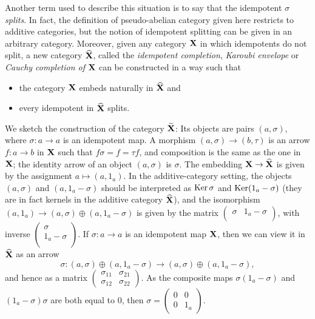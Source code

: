 Another term used to describe this situation is to say that the
idempotent $\sigma$ \emph{splits}. In fact, the definition of
pseudo-abelian category given here restricts to additive categories,
but the notion of idempotent splitting can be given in an arbitrary
category. Moreover, given any category ${\bf X}$ in which idempotents
do not split, a new category $\widehat{\bf X}$, called the
\emph{idempotent completion}, \emph{Karoubi envelope} or \emph{Cauchy
  completion of} ${\bf X}$ can be constructed in a way such that
\begin{itemize}
\item the category ${\bf X}$ embeds naturally in $\widehat{\bf X}$ and
\item every idempotent in $\widehat{\bf X}$ splits.
\end{itemize}
We sketch the construction of the category $\widetilde{{\bf X}}$: Its
objects are pairs $(a,\sigma )$, where $\sigma :a\to a$ is an
idempotent map. A morphism $(a,\sigma )\to (b,\tau )$ is an arrow
$f:a\to b$ in ${\bf X}$ such that $f\sigma =f=\tau f$, and composition
is the same as the one in ${\bf X}$; the identity arrow of an object
$(a,\sigma )$ is $\sigma$. The embedding ${\bf X}\to \widehat{\bf X}$
is given by the assignment $a\mapsto (a,1_a)$. In the
additive-category setting, the objects $(a,\sigma )$ and
$(a,1_a-\sigma )$ should be interpreted as $\operatorname{Ker}\sigma $ and
$\operatorname{Ker}(1_a-\sigma )$ (they are in fact kernels in the additive
category $\widehat{{\bf X}}$), and the isomorphism $(a,1_a)\to
(a,\sigma )\oplus (a,1_a-\sigma )$ is given by the matrix $\left
  (\begin{smallmatrix} \sigma & 1_a-\sigma \\ \end{smallmatrix} \right
)$, with inverse $\left (\begin{smallmatrix} \sigma \\ 1_a-\sigma
    \\ \end{smallmatrix} \right )$. If $\sigma :a\to a$ is an
idempotent map ${\bf X}$, then we can view it in $\widehat{\bf X}$ as
an arrow
$$\sigma :(a,\sigma )\oplus (a,1_a-\sigma )\longrightarrow (a,\sigma )\oplus (a,1_a-\sigma ),$$
and hence as a matrix $\left (\begin{smallmatrix} \sigma_{11} &
    \sigma_{21} \\ \sigma_{12} & \sigma_{22} \end{smallmatrix} \right
)$. As the composite maps $\sigma (1_a-\sigma )$ and $(1_a-\sigma
)\sigma$ are both equal to 0, then $\sigma = \left
  (\begin{smallmatrix} 0 & 0 \\ 0 & 1_a \end{smallmatrix} \right )$.

